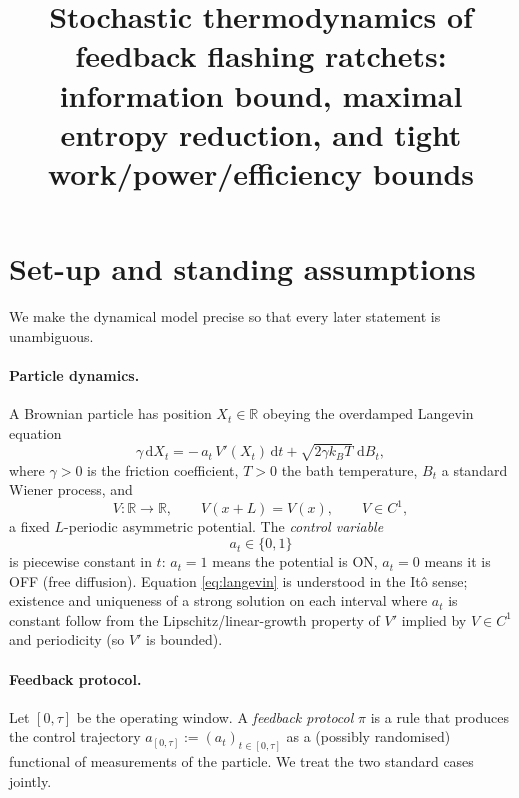 \documentclass{amsart}
\theoremstyle{definition}
\newcommand{\R}{\mathbb{R}}
\newcommand{\kB}{k_{B}}
\newcommand{\dd}{\mathrm{d}}
\begin{document}
\title{Stochastic thermodynamics of feedback flashing ratchets:
information bound, maximal entropy reduction, and tight work/power/efficiency bounds}
\author{}
\date{}
\maketitle

\section{Set-up and standing assumptions}

We make the dynamical model precise so that every later statement is
unambiguous.

\paragraph{Particle dynamics.}
A Brownian particle has position $X_t\in\R$ obeying the overdamped Langevin
equation
\begin{equation}\label{eq:langevin}
\gamma\,\dd X_t = -\,a_t\,V'(X_t)\,\dd t + \sqrt{2\gamma \kB T}\;\dd B_t ,
\end{equation}
where $\gamma>0$ is the friction coefficient, $T>0$ the bath temperature,
$B_t$ a standard Wiener process, and
\[
V:\R\to\R,\qquad V(x+L)=V(x),\qquad V\in C^{1},
\]
a fixed $L$-periodic asymmetric potential. The \emph{control variable}
\[
a_t\in\{0,1\}
\]
is piecewise constant in $t$: $a_t=1$ means the potential is ON,
$a_t=0$ means it is OFF (free diffusion). Equation \eqref{eq:langevin} is
understood in the It\^o sense; existence and uniqueness of a strong solution
on each interval where $a_t$ is constant follow from the Lipschitz/linear-growth
property of $V'$ implied by $V\in C^1$ and periodicity (so $V'$ is bounded).

\paragraph{Feedback protocol.}
Let $[0,\tau]$ be the operating window. A \emph{feedback protocol}
$\pi$ is a rule that produces the control trajectory
$a_{[0,\tau]}:=(a_t)_{t\in[0,\tau]}$ as a (possibly randomised) functional
of measurements of the particle. We treat the two standard cases jointly.
\end{document}
